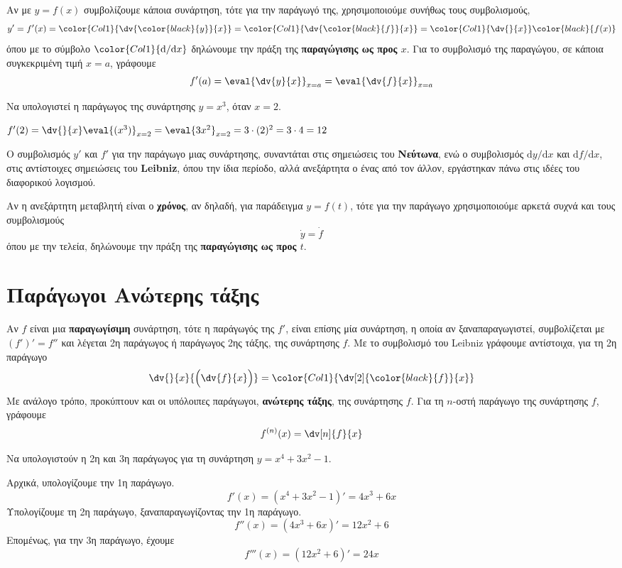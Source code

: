 Αν με $ y= f(x) $ συμβολίζουμε κάποια συνάρτηση, τότε για την παράγωγό της, 
χρησιμοποιούμε συνήθως τους συμβολισμούς,
\[
  y' = f'(x) = \color{Col1}{\dv{\color{black}{y}}{x}} =
  \color{Col1}{\dv{\color{black}{f}}{x}} =
  \color{Col1}{\dv{}{x}} \color{black}{f (x)} 
\] 
όπου με το σύμβολο $\color{Col1}{\mathrm{d}/\mathrm{d}x}$ δηλώνουμε την πράξη της 
\textbf{παραγώγισης ως προς $x$}. Για το συμβολισμό της παραγώγου, σε κάποια 
συγκεκριμένη τιμή $ x= a $, γράφουμε
\[
  f'(a) = \eval{\dv{y}{x}}_{x= a} = \eval{\dv{f}{x}}_{x=a} 
\] 
\begin{example}
  Να υπολογιστεί η παράγωγος της συνάρτησης $ y= x^{3} $, όταν $ x=2 $.
\end{example}
\begin{solution}
  $ f'(2) = \dv{}{x}\eval{(x^{3})}_{x=2} = \eval{3x^{2}}_{x=2} = 3\cdot (2)^{2} = 3\cdot
  4 = 12 $
\end{solution}
\begin{rem}
  Ο συμβολισμός $ y' $ και $ f' $ για την παράγωγο μιας συνάρτησης, συναντάται στις
  σημειώσεις του \textbf{Νεύτωνα}, ενώ ο συμβολισμός $ \mathrm{d}y/\mathrm{d}x $ και 
  $ \mathrm{d}f/\mathrm{d}x $, στις αντίστοιχες σημειώσεις του \textbf{Leibniz}, όπου 
  την ίδια περίοδο, αλλά ανεξάρτητα ο ένας από τον άλλον, εργάστηκαν πάνω στις ιδέες του 
  διαφορικού λογισμού.
\end{rem}
\begin{rem}
  Αν η ανεξάρτητη μεταβλητή είναι ο \textbf{χρόνος}, αν δηλαδή, για παράδειγμα 
  $ y=f(t) $, τότε για την παράγωγο χρησιμοποιούμε αρκετά συχνά και τους συμβολισμούς
  \[
    \dot y = \dot f
  \] 
  όπου με την τελεία, δηλώνουμε την πράξη της \textbf{παραγώγισης ως προς $t$}. 
\end{rem}


\section*{Παράγωγοι Ανώτερης τάξης}

Αν $f$ είναι μια \textbf{παραγωγίσιμη} συνάρτηση, τότε η παράγωγός της $ f' $, είναι 
επίσης μία συνάρτηση, η οποία αν ξαναπαραγωγιστεί, συμβολίζεται με $ (f')' = f'' $ 
και λέγεται \textcolor{Col1}{2η παράγωγος} ή \textcolor{Col1}{παράγωγος 2ης τάξης}, της 
συνάρτησης $f$. Με το συμβολισμό του Leibniz γράφουμε αντίστοιχα, για τη 2η παράγωγο
\[
  \dv{}{x} {\Bigl(\dv{f}{x}\Bigr)} = \color{Col1}{\dv[2]{\color{black}{f}}{x}}  
\] 
Με ανάλογο τρόπο, προκύπτουν και οι υπόλοιπες παράγωγοι, \textbf{ανώτερης τάξης}, 
της συνάρτησης $f$. Για τη $n$-οστή παράγωγο της συνάρτησης $f$, γράφουμε
\[
  f^{(n)}(x) = \dv[n]{f}{x} %
\] 
\begin{example}
  Να υπολογιστούν η 2η και 3η παράγωγος για τη συνάρτηση $ y=x^{4}+3x^{2}-1 $.
\end{example}
\begin{solution}
  Αρχικά, υπολογίζουμε την 1η παράγωγο.
  \[
    f'(x) = (x^{4}+3x^{2}-1)' = 4x^{3}+6x 
  \] 
  Υπολογίζουμε τη 2η παράγωγο, ξαναπαραγωγίζοντας την 1η παράγωγο.
  \[
    f''(x) = (4x^{3}+6x)' = 12x^{2}+6 
  \] 
  Επομένως, για την 3η παράγωγο, έχουμε
  \[
    f'''(x) = (12x^{2}+6)' = 24x 
  \]
\end{solution}


